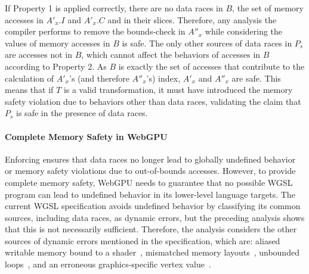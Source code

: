 If Property 1 is applied correctly, there are no data races in $B$, the set of memory accesses in $A'_x.I$ and $A'_x.C$ and in their slices. Therefore, any analysis the compiler performs to remove the bounds-check in $A''_x$ while considering the values of memory accesses in $B$ is safe. The only other sources of data races in $P_s$ are accesses not in $B$, which cannot affect the behaviors of accesses in $B$ according to Property 2. As $B$ is exactly the set of accesses that contribute to the calculation of $A'_x$'s (and therefore $A''_x$'s) index, $A'_x$ and $A''_x$ are safe. This means that if $T$ is a valid transformation, it must have introduced the memory safety violation due to behaviors other than data races, validating the claim that $P_s$ is safe in the presence of data races.

\paragraph{Complete Memory Safety in WebGPU}

Enforcing \smsg ensures that data races no longer lead to globally undefined behavior or memory safety violations due to out-of-bounds accesses. However, to provide complete memory safety, WebGPU needs to guarantee that no possible WGSL program can lead to undefined behavior in its lower-level language targets. The current WGSL specification avoids undefined behavior by classifying its common sources, including data races, as dynamic errors, but the preceding analysis shows that this is not necessarily sufficient. Therefore, the analysis considers the other sources of dynamic errors mentioned in the specification, which are: aliased writable memory bound to a shader~\cite[]{wgslspec}, mismatched memory layouts~\cite[]{wgslspec}, unbounded loops~\cite[.3]{wgslspec}, and an erroneous graphics-specific vertex value~\cite[]{wgslspec}.

